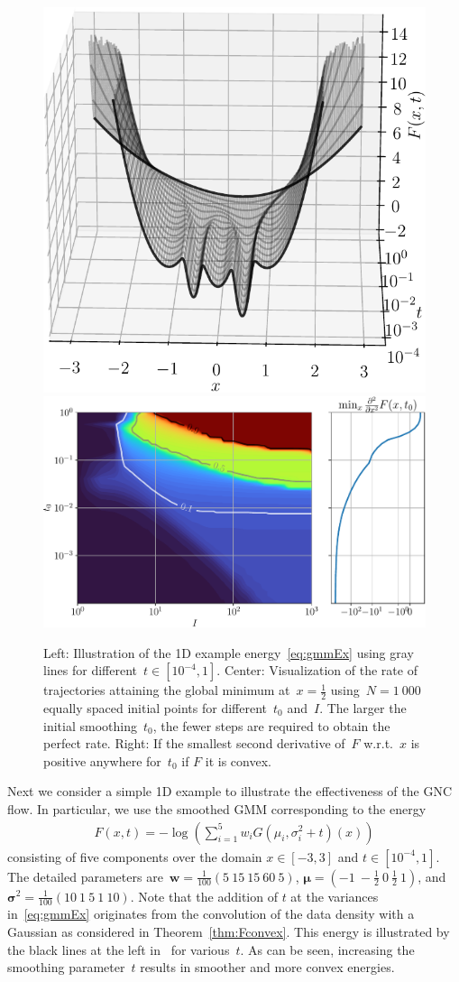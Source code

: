 \documentclass{article}
\theoremstyle{plain}
\theoremstyle{definition}
\theoremstyle{remark}
\begin{document}
\begin{figure}[th]
\centering
\includegraphics[width=.35\linewidth]{./figures/ex_gmm/ex_gmm_func}
\includegraphics[width=.6\linewidth]{./figures/ex_gmm/ex_gmm_rate}
\label{fig:gmmOptimization}
\caption{Left: Illustration of the 1D example energy~\eqref{eq:gmmEx} using gray lines for different~$t\in[10^{-4},1]$.
Center: Visualization of the rate of trajectories attaining the global minimum at~$x=\frac{1}{2}$ using~$N=1\ 000$ equally spaced initial points for different~$t_0$ and~$I$.
The larger the initial smoothing~$t_0$, the fewer steps are required to obtain the perfect rate.
Right: If the smallest second derivative of~$F$ w.r.t.~$x$ is positive anywhere for~$t_0$ if $F$ it is convex.
}
\end{figure}
Next we consider a simple 1D example to illustrate the effectiveness of the GNC flow.
In particular, we use the smoothed GMM corresponding to the energy
\begin{align} \label{eq:gmmEx}
F(x,t)=-\log\left(\sum_{i=1}^5 w_i G\left(\mu_i,\sigma_i^2+t\right)(x)\right)
\end{align}
consisting of five components over the domain $x\in[-3,3]$ and $t\in[10^{-4},1]$.
The detailed parameters are~$\bm{w}=\tfrac{1}{100}(5\ 15\ 15\ 60\ 5)$, $\bm{\mu}=(-1\ -\tfrac12\ 0\ \tfrac12\ 1)$, and $\bm{\sigma}^2=\tfrac{1}{100}(10\ 1\ 5\ 1\ 10)$.
Note that the addition of $t$ at the variances in~\eqref{eq:gmmEx} originates from the convolution of the data density with a Gaussian as considered in Theorem~\ref{thm:Fconvex}.
This energy is illustrated by the black lines at the left in~ for various~$t$.
As can be seen, increasing the smoothing parameter~$t$ results in smoother and more convex energies.
\end{document}
